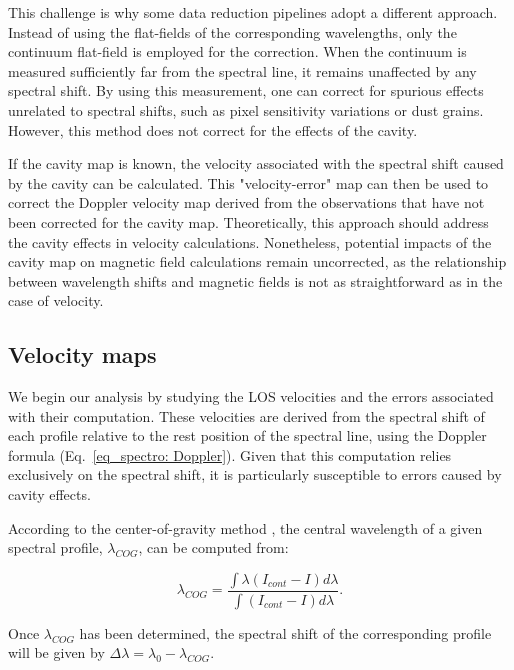 This challenge is why some data reduction pipelines adopt a different approach. Instead of using the flat-fields of the corresponding wavelengths, only the continuum flat-field is employed for the correction. When the continuum is measured sufficiently far from the spectral line, it remains unaffected by any spectral shift. By using this measurement, one can correct for spurious effects unrelated to spectral shifts, such as pixel sensitivity variations or dust grains. However, this method does not correct for the effects of the cavity.

If the cavity map is known, the velocity associated with the spectral shift caused by the cavity can be calculated. This "velocity-error" map can then be used to correct the Doppler velocity map derived from the observations that have not been corrected for the cavity map. Theoretically, this approach should address the cavity effects in velocity calculations. Nonetheless, potential impacts of the cavity map on magnetic field calculations remain uncorrected, as the relationship between wavelength shifts and magnetic fields is not as straightforward as in the case of velocity.

\subsection{\label{sect: mancha_vlos}Velocity maps}

We begin our analysis by studying the LOS velocities and the errors associated with their computation. These velocities are derived from the spectral shift of each profile relative to the rest position of the spectral line, using the Doppler formula (Eq.~\eqref{eq_spectro: Doppler}). Given that this computation relies exclusively on the spectral shift, it is particularly susceptible to errors caused by cavity effects.

According to the center-of-gravity method \citep{center_of_gravity}, the central wavelength of a given spectral profile, $\lambda _ {COG}$, can be computed from:

\begin{equation}
  \lambda _ {COG} = \frac{\int \lambda \left( I _{cont} - I\right)d\lambda}{\int \left( I _{cont} - I\right)d\lambda}. 
\end{equation}

Once $\lambda _ {COG}$ has been determined, the spectral shift of the corresponding profile will be given by $\Delta \lambda = \lambda _ 0 - \lambda _ {COG}$. 

